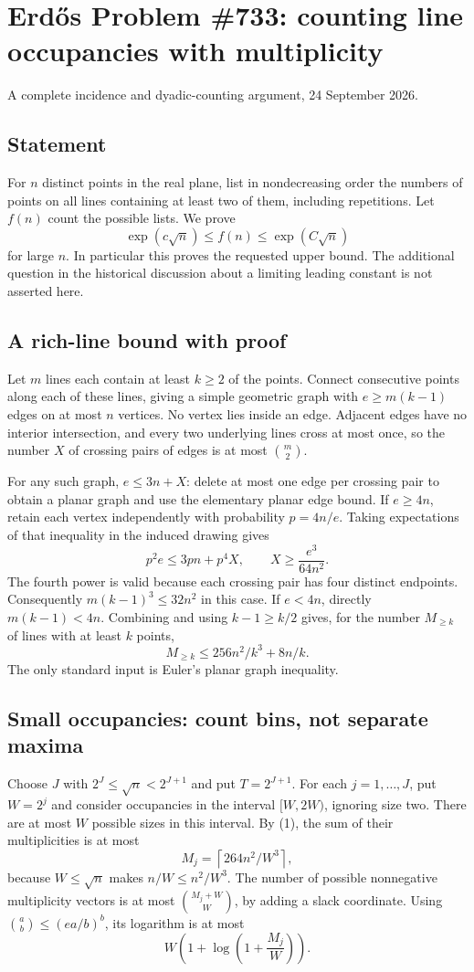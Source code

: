 \section{Erd\H{o}s Problem \#733: counting line occupancies with multiplicity}
\noindent A complete incidence and dyadic-counting argument, 24 September 2026.

\subsection*{Statement}
For $n$ distinct points in the real plane, list in nondecreasing order the numbers of points on all lines containing at least two of them, including repetitions. Let $f(n)$ count the possible lists. We prove
\[
 \exp(c\sqrt n)\leq f(n)\leq\exp(C\sqrt n)
\]
for large $n$. In particular this proves the requested upper bound. The additional question in the historical discussion about a limiting leading constant is not asserted here.

\subsection*{A rich-line bound with proof}
Let $m$ lines each contain at least $k\geq2$ of the points. Connect consecutive points along each of these lines, giving a simple geometric graph with $e\geq m(k-1)$ edges on at most $n$ vertices. No vertex lies inside an edge. Adjacent edges have no interior intersection, and every two underlying lines cross at most once, so the number $X$ of crossing pairs of edges is at most $\binom m2$.

For any such graph, $e\leq3n+X$: delete at most one edge per crossing pair to obtain a planar graph and use the elementary planar edge bound. If $e\geq4n$, retain each vertex independently with probability $p=4n/e$. Taking expectations of that inequality in the induced drawing gives
\[
 p^2e\leq3pn+p^4X,\qquad X\geq\frac{e^3}{64n^2}.
\]
The fourth power is valid because each crossing pair has four distinct endpoints. Consequently $m(k-1)^3\leq32n^2$ in this case. If $e<4n$, directly $m(k-1)<4n$. Combining and using $k-1\geq k/2$ gives, for the number $M_{\geq k}$ of lines with at least $k$ points,
\[
 M_{\geq k}\leq256n^2/k^3+8n/k. \tag{1}
\]
The only standard input is Euler's planar graph inequality.

\subsection*{Small occupancies: count bins, not separate maxima}
Choose $J$ with $2^J\leq\sqrt n<2^{J+1}$ and put $T=2^{J+1}$. For each $j=1,\ldots,J$, put $W=2^j$ and consider occupancies in the interval $[W,2W)$, ignoring size two. There are at most $W$ possible sizes in this interval.
By (1), the sum of their multiplicities is at most
\[
 M_j=\left\lceil264n^2/W^3\right\rceil,
\]
because $W\leq\sqrt n$ makes $n/W\leq n^2/W^3$. The number of possible nonnegative multiplicity vectors is at most
$\binom{M_j+W}{W}$, by adding a slack coordinate. Using
$\binom ab\leq(ea/b)^b$, its logarithm is at most
\[
 W\left(1+\log\left(1+\frac{M_j}{W}\right)\right). \tag{2}
\]

